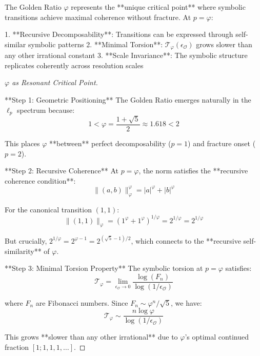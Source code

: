 \begin{lemma}
\label{lemma:bk5_phi_critical_resonant_norm}
The Golden Ratio $\varphi$ represents the **unique critical point** where symbolic transitions achieve maximal coherence without fracture. At $p = \varphi$:

1. **Recursive Decomposability**: Transitions can be expressed through self-similar symbolic patterns
2. **Minimal Torsion**: $\mathcal{T}_\varphi(\epsilon_\mathcal{O})$ grows slower than any other irrational constant
3. **Scale Invariance**: The symbolic structure replicates coherently across resolution scales
\end{lemma}

\begin{proof}[$\varphi$ as Resonant Critical Point]
\label{proof:bk5_phi_critical_resonant_norm}

**Step 1: Geometric Positioning**
The Golden Ratio emerges naturally in the $\ell_p$ spectrum because:
$$1 < \varphi = \frac{1+\sqrt{5}}{2} \approx 1.618 < 2$$

This places $\varphi$ **between** perfect decomposability ($p=1$) and fracture onset ($p=2$).

**Step 2: Recursive Coherence**
At $p = \varphi$, the norm satisfies the **recursive coherence condition**:
$$\|(a,b)\|_\varphi^{\varphi} = |a|^{\varphi} + |b|^{\varphi}$$

For the canonical transition $(1,1)$:
$$\|(1,1)\|_\varphi = (1^{\varphi} + 1^{\varphi})^{1/\varphi} = 2^{1/\varphi} = 2^{1/\varphi}$$

But crucially, $2^{1/\varphi} = 2^{\varphi-1} = 2^{(\sqrt{5}-1)/2}$, which connects to the **recursive self-similarity** of $\varphi$.

**Step 3: Minimal Torsion Property**
The symbolic torsion at $p = \varphi$ satisfies:
$$\mathcal{T}_\varphi = \lim_{\epsilon_\mathcal{O} \to 0} \frac{\log(F_n)}{\log(1/\epsilon_\mathcal{O})}$$

where $F_n$ are Fibonacci numbers. Since $F_n \sim \varphi^n/\sqrt{5}$, we have:
$$\mathcal{T}_\varphi \sim \frac{n \log \varphi}{\log(1/\epsilon_\mathcal{O})}$$

This grows **slower than any other irrational** due to $\varphi$'s optimal continued fraction $[1;1,1,1,\ldots]$.
\end{proof}

